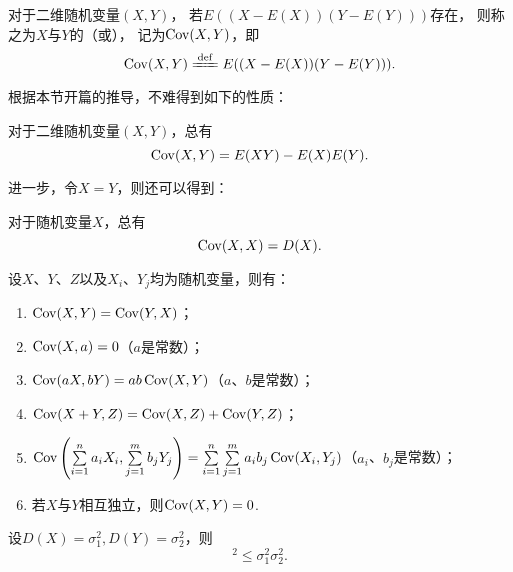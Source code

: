 \begin{definition}
对于二维随机变量\((X,Y)\)，
若\(E((X-E(X))(Y-E(Y)))\)存在，
则称之为\(X\)与\(Y\)的（或），
记为\(\operatorname{Cov}(X,Y)\)，即
\begin{equation}\label{equation:随机变量的数字特征.协方差的定义式}
    \Cov(X,Y) \defeq E((X-E(X))(Y-E(Y))).
\end{equation}
\end{definition}

根据本节开篇的推导，不难得到如下的性质：
\begin{property}\label{theorem:随机变量的数字特征.协方差的性质1}
对于二维随机变量\((X,Y)\)，总有
\begin{equation}\label{equation:随机变量的数字特征.协方差的计算式1}
    \operatorname{Cov}(X,Y) = E(XY) - E(X) E(Y).
\end{equation}
\end{property}

进一步，令\(X = Y\)，则还可以得到：
\begin{property}\label{theorem:随机变量的数字特征.协方差的性质2}
对于随机变量\(X\)，总有
\begin{equation}\label{equation:随机变量的数字特征.协方差与方差的联系1}
    \operatorname{Cov}(X,X) = D(X).
\end{equation}
\end{property}

\begin{property}\label{theorem:随机变量的数字特征.协方差的性质3}
设\(X\)、\(Y\)、\(Z\)以及\(X_i\)、\(Y_j\)均为随机变量，则有：
\begin{enumerate}
    \item \(\operatorname{Cov}(X,Y)=\operatorname{Cov}(Y,X)\)；
    \item \(\operatorname{Cov}(X,a)=0\)（\(a\)是常数）；
    \item \(\operatorname{Cov}(aX,bY)=ab\operatorname{Cov}(X,Y)\)（\(a\)、\(b\)是常数）；
    \item \(\operatorname{Cov}(X+Y,Z)=\operatorname{Cov}(X,Z)+\operatorname{Cov}(Y,Z)\)；
    \item \(\operatorname{Cov}\left(\sum\limits_{i=1}^n{a_i X_i},\sum\limits_{j=1}^m{b_j Y_j}\right)
    = \sum\limits_{i=1}^n \sum\limits_{j=1}^m {a_i b_j \operatorname{Cov}(X_i,Y_j)}\)（\(a_i\)、\(b_j\)是常数）；
    \item 若\(X\)与\(Y\)相互独立，则\(\operatorname{Cov}(X,Y)=0\).
\end{enumerate}
\end{property}

\begin{theorem}
设\(D(X) = \sigma_1^2, D(Y) = \sigma_2^2\)，则
\begin{equation}
    [\Cov(X,Y)]^2 \leq \sigma_1^2 \sigma_2^2.
\end{equation}
\end{theorem}

